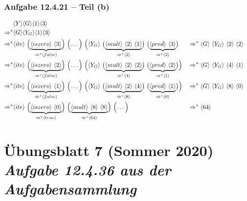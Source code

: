 \documentclass{beamer}
\newcommand{\num}[1]{\ensuremath{\langle #1 \rangle}}
\begin{document}
\begin{frame} \frametitle{Aufgabe 12.4.21 -- Teil (b)}
	\scriptsize
	\begin{alignat*}{2}
	&\num{Y} \num{G} \num{1} \num{3} \\
	\Rightarrow^\ast &\num{G} \num{Y_G} \num{1} \num{3} \\
	\Rightarrow^\ast 
	&\num{ite} \ 
	\Bigl( \underbrace{\num{iszero} \ \num{3}}_{\Rightarrow^\ast \num{false}} \Bigr) \ \Bigl( \dots \Bigr) \ \Bigl( \num{Y_G} \ \bigl( \underbrace{\num{mult} \ \num{2} \ \num{1}}_{\Rightarrow^\ast \num{2}} \bigr) \ \bigl(\underbrace{\num{pred} \ \num{3}}_{\Rightarrow^\ast \num{2}} \bigr) 
	&&\Rightarrow^\ast 
	\num{G} \ \num{Y_G} \ \num{2} \ \num{2} \\
	\Rightarrow^\ast 
	&\num{ite} \ 
	\Bigl( \underbrace{\num{iszero} \ \num{2}}_{\Rightarrow^\ast \num{false}} \Bigr) \ \Bigl( \dots \Bigr) \ \Bigl( \num{Y_G} \ \bigl( \underbrace{\num{mult} \ \num{2} \ \num{2}}_{\Rightarrow^\ast \num{4}} \bigr) \ \bigl(\underbrace{\num{pred} \ \num{2}}_{\Rightarrow^\ast \num{1}} \bigr) \Bigr)
	&&\Rightarrow^\ast 
	\num{G} \ \num{Y_G} \ \num{4} \ \num{1} \\
	\Rightarrow^\ast 
	&\num{ite} \ 
	\Bigl( \underbrace{\num{iszero} \ \num{1}}_{\Rightarrow^\ast \num{false}} \Bigr) \ \Bigl( \dots \Bigr) \ \Bigl( \num{Y_G} \ \bigl( \underbrace{\num{mult} \ \num{2} \ \num{4}}_{\Rightarrow^\ast \num{8}} \bigr) \ \bigl(\underbrace{\num{pred} \ \num{1}}_{\Rightarrow^\ast \num{0}} \bigr) \Bigr)
	&&\Rightarrow^\ast
	\num{G} \ \num{Y_G} \ \num{8} \ \num{0} \\
	\Rightarrow^\ast
	&\num{ite} \ 
	\Bigl( \underbrace{\num{iszero} \ \num{0}}_{\Rightarrow^\ast \num{true}} \Bigr) \ \Bigl( \underbrace{\num{mult} \ \num{8} \ \num{8}}_{\Rightarrow^\ast \num{64}} \Bigr) \ \Bigl( \dots \Bigr)
	&&\Rightarrow^\ast \num{64}
	\end{alignat*}
\end{frame}


\section{Übungsblatt 7 (Sommer 2020)\\ \textit{\normalsize Aufgabe 12.4.36 aus der Aufgabensammlung}}
\end{document}
